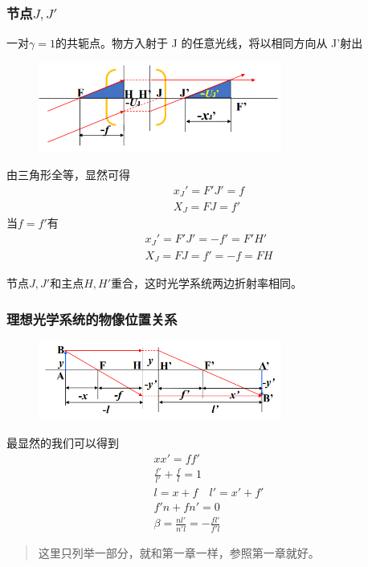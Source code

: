 \subsubsection{节点$J,J'$}
一对$\gamma=1$的共轭点。物方入射于 J 的任意光线，将以相同方向从 J’射出
        \begin{figure}[H]
            \centering
            \includegraphics[width=8cm]{img/3.2.png}
            \end{figure}
由三角形全等，显然可得
\begin{align}
    x_J'={F'J'}=f \tag{3.3.1.a} \\
    X_J=FJ=f' \tag{3.3.1.b}
 \end{align}
当$f=f'$有
\begin{align}
    x_J'={F'J'}=-f'=F'H' \tag{3.3.1.a} \\
    X_J=FJ=f'=-f=FH \tag{3.3.1.b}
 \end{align}

节点$J,J'$和主点$H,H'$重合，这时光学系统两边折射率相同。


\subsubsection{理想光学系统的物像位置关系}
        \begin{figure}[H]
            \centering
            \includegraphics[width=8cm]{img/3.3.png}
            \end{figure}
最显然的我们可以得到
\begin{align}
    x x'=f f' \tag{2.3.5.a}\\
    \frac{f'}{l'}+\frac{f}{l}=1 \tag{2.3.5.b}\\
    l=x+f \quad l'=x'+f' \tag{2.3.5.c} \\
    f'n+fn'=0 \tag{2.3.5.d} \\
    \beta=\frac{nl'}{n'l}=-\frac{fl'}{f'l} \tag{2.3.5.e}
\end{align}
\begin{quote}
{\ccwd\kaishu{}
这里只列举一部分，就和第一章一样，参照第一章就好。
}
\end{quote}

